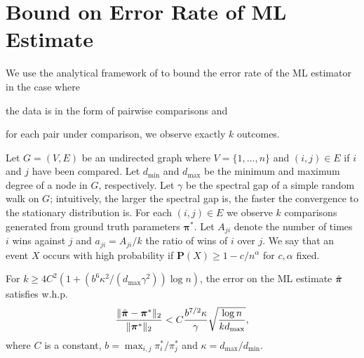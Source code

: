 \section{Bound on Error Rate of ML Estimate}

We use the analytical framework of \citet{negahban2017rank} to bound the error rate of the ML estimator in the case where
\begin{enuminline}
\item the data is in the form of pairwise comparisons and
\item for each pair under comparison, we observe exactly $k$ outcomes.
\end{enuminline}

Let $G = (V, E)$ be an undirected graph where $V = \{ 1, \ldots, n \}$ and $(i, j) \in E$ if $i$ and $j$ have been compared.
Let $d_{\min}$ and $d_{\max}$ be the minimum and maximum degree of a node in $G$, respectively.
Let $\gamma$ be the spectral gap of a simple random walk on $G$;
intuitively, the larger the spectral gap is, the faster the convergence to the stationary distribution is.
For each $(i, j) \in E$ we observe $k$ comparisons generated from ground truth parameters $\bm{\pi}^*$.
Let $A_{ji}$ denote the number of times $i$ wins against $j$ and $a_{ji} = A_{ji} / k$ the ratio of wins of $i$ over $j$.
We say that an event $X$ occurs with high probability if $\mathbf{P}(X) \ge 1 - c / n^\alpha$ for $c, \alpha$ fixed.

\begin{theorem}
\label{fix:thm:mlbound}
For $k \ge 4C^2 (1 + (b^6 \kappa^2 / (d_{\max} \gamma^2)) \log n)$, the error on the ML estimate $\hat{\bm{\pi}}$ satisfies w.h.p.
\begin{align}
\frac{\Vert \hat{\bm{\pi}} - \bm{\pi}^* \Vert_2}{\Vert \bm{\pi}^* \Vert_2} < C \frac{b^{7/2} \kappa}{\gamma} \sqrt{\frac{\log n}{kd_{\max}}},
\end{align}
where $C$ is a constant, $b = \max_{i,j} \pi^*_i / \pi^*_j$ and $\kappa = d_{\max} / d_{\min}$.
\end{theorem}

